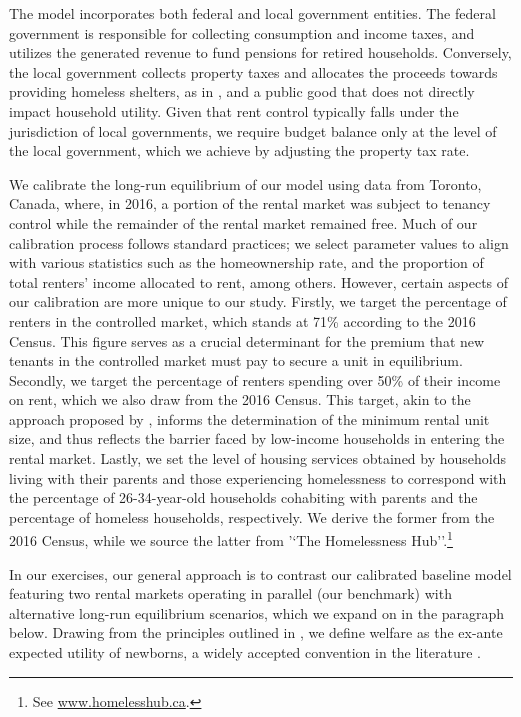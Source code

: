 \documentclass[parskip=full]{article}
\begin{document}
The model incorporates both federal and local government entities. The federal government is responsible for collecting consumption and income taxes, and utilizes the generated revenue to fund pensions for retired households. Conversely, the local government collects property taxes and allocates the proceeds towards providing homeless shelters, as in \citet{abramson-2024}, and a public good that does not directly impact household utility. Given that rent control typically falls under the jurisdiction of local governments, we require budget balance only at the level of the local government, which we achieve by adjusting the property tax rate.

We calibrate the long-run equilibrium of our model using data from Toronto, Canada, where, in 2016, a portion of the rental market was subject to tenancy control while the remainder of the rental market remained free. Much of our calibration process follows standard practices; we select parameter values to align with various statistics such as the homeownership rate, and the proportion of total renters' income allocated to rent, among others. However, certain aspects of our calibration are more unique to our study. Firstly, we target the percentage of renters in the controlled market, which stands at 71\% according to the 2016 Census. This figure serves as a crucial determinant for the premium that new tenants in the controlled market must pay to secure a unit in equilibrium. Secondly, we target the percentage of renters spending over 50\% of their income on rent, which we also draw from the 2016 Census. This target, akin to the approach proposed by \citet{rs-2023}, informs the determination of the minimum rental unit size, and thus reflects the barrier faced by low-income households in entering the rental market. Lastly, we set the level of housing services obtained by households living with their parents and those experiencing homelessness to correspond with the percentage of 26-34-year-old households cohabiting with parents and the percentage of homeless households, respectively. We derive the former from the 2016 Census, while we source the latter from '`The Homelessness Hub''.\footnote{See \url{www.homelesshub.ca}.}

In our exercises, our general approach is to contrast our calibrated baseline model featuring two rental markets operating in parallel (our benchmark) with alternative long-run equilibrium scenarios, which we expand on in the paragraph below. Drawing from the principles outlined in \citet{ralws-1971}, we define welfare as the ex-ante expected utility of newborns, a widely accepted convention in the literature \citep{conesa-et-al,gkkoc}.
\end{document}

